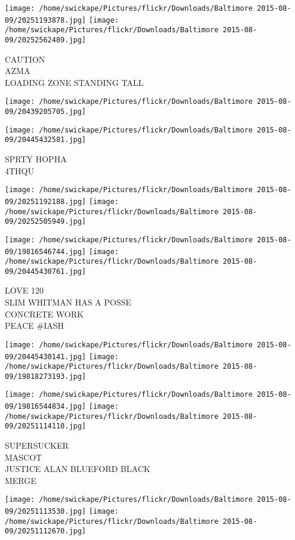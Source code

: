 \documentclass[10pt,letterpaper]{article}
\begin{document}
\vspace{0.25in}
\texttt{[image: /home/swickape/Pictures/flickr/Downloads/Baltimore 2015-08-09/20251193878.jpg]}
\texttt{[image: /home/swickape/Pictures/flickr/Downloads/Baltimore 2015-08-09/20252562489.jpg]}

CAUTION\\
AZMA\\
LOADING ZONE STANDING TALL
\pagebreak

\texttt{[image: /home/swickape/Pictures/flickr/Downloads/Baltimore 2015-08-09/20439205705.jpg]}

\vspace{0.25in}
\texttt{[image: /home/swickape/Pictures/flickr/Downloads/Baltimore 2015-08-09/20445432581.jpg]}

SPRTY HOPHA\\
4THQU
\pagebreak

\texttt{[image: /home/swickape/Pictures/flickr/Downloads/Baltimore 2015-08-09/20251192188.jpg]}
\texttt{[image: /home/swickape/Pictures/flickr/Downloads/Baltimore 2015-08-09/20252505949.jpg]}

\texttt{[image: /home/swickape/Pictures/flickr/Downloads/Baltimore 2015-08-09/19816546744.jpg]}
\texttt{[image: /home/swickape/Pictures/flickr/Downloads/Baltimore 2015-08-09/20445430761.jpg]}

LOVE 120\\
SLIM WHITMAN HAS A POSSE\\
CONCRETE WORK\\
PEACE \#IASH
\pagebreak

\texttt{[image: /home/swickape/Pictures/flickr/Downloads/Baltimore 2015-08-09/20445430141.jpg]}
\texttt{[image: /home/swickape/Pictures/flickr/Downloads/Baltimore 2015-08-09/19818273193.jpg]}

\texttt{[image: /home/swickape/Pictures/flickr/Downloads/Baltimore 2015-08-09/19816544834.jpg]}
\texttt{[image: /home/swickape/Pictures/flickr/Downloads/Baltimore 2015-08-09/20251114110.jpg]}

SUPERSUCKER\\
MASCOT\\
JUSTICE ALAN BLUEFORD BLACK\\
MERGE
\pagebreak

\texttt{[image: /home/swickape/Pictures/flickr/Downloads/Baltimore 2015-08-09/20251113530.jpg]}
\texttt{[image: /home/swickape/Pictures/flickr/Downloads/Baltimore 2015-08-09/20251112670.jpg]}
\end{document}
